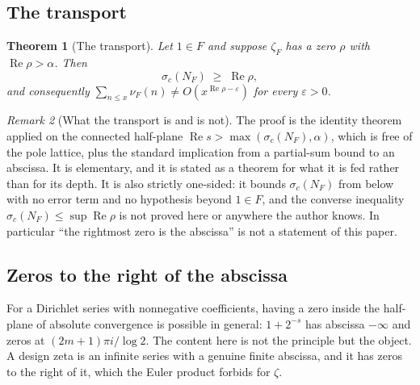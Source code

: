 \documentclass[11pt]{amsart}
\newtheorem{theorem}{Theorem}[section]
\theoremstyle{definition}
\theoremstyle{remark}
\newtheorem{remark}[theorem]{Remark}
\begin{document}
\subsection{The transport}
\label{sub:transport}

\begin{theorem}[The transport]
\label{thm:transport}
Let $1 \in F$ and suppose $\zeta_{F}$ has a zero $\rho$ with $\operatorname{Re}\rho > \alpha$. Then
\[
  \sigma_{c}(N_{F}) \;\ge\; \operatorname{Re}\rho,
\]
and consequently $\sum_{n \le x} \nu_{F}(n) \ne O(x^{\operatorname{Re}\rho - \varepsilon})$ for every $\varepsilon > 0$.
\end{theorem}

\begin{remark}[What the transport is and is not]
\label{rem:onesided}
The proof is the identity theorem applied on the connected half-plane $\operatorname{Re} s > \max(\sigma_{c}(N_{F}), \alpha)$, which is free of the pole lattice, plus the standard implication from a partial-sum bound to an abscissa. It is elementary, and it is stated as a theorem for what it is fed rather than for its depth. It is also strictly one-sided: it bounds $\sigma_{c}(N_{F})$ from below with no error term and no hypothesis beyond $1 \in F$, and the converse inequality $\sigma_{c}(N_{F}) \le \sup \operatorname{Re}\rho$ is not proved here or anywhere the author knows. In particular ``the rightmost zero is the abscissa'' is not a statement of this paper.
\end{remark}

\subsection{Zeros to the right of the abscissa}
\label{sub:zeros}

For a Dirichlet series with nonnegative coefficients, having a zero inside the half-plane of absolute convergence is possible in general: $1 + 2^{-s}$ has abscissa $-\infty$ and zeros at $(2m+1)\pi i/\log 2$. The content here is not the principle but the object. A design zeta is an infinite series with a genuine finite abscissa, and it has zeros to the right of it, which the Euler product forbids for $\zeta$.
\end{document}
